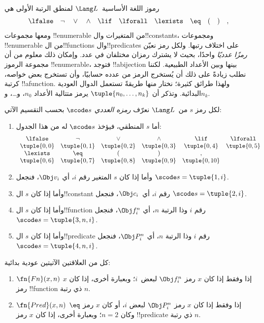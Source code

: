 \documentclass[../../../include/open-logic-section]{subfiles}
\begin{document}

رموز اللغة الأساسية~$\Lang L$ لمنطق الرتبة الأولى هي
\[
\lfalse \quad \lnot \quad \lor \quad \land \quad \lif \quad \lforall
\quad \lexists \quad \eq \quad ( \quad ) \quad ,
\]
ومعها مجموعات !!{enumerable} من المتغيرات
وال!!{constant}s، ومجموعات !!{enumerable}
من ال!!{function}s وال!!{predicate}s على
اختلاف رتبها. ولكل رمز نعيّن \emph{رمزًا عدديًا}
واحدًا، بحيث لا يشترك رمزان مختلفان في عدد.
وإمكان ذلك معلوم من أن مجموعة الرموز
!!{enumerable}، فتوجد !!a{bijection} بينها
وبين الأعداد الطبيعية. لكننا نطلب زيادةً
على ذلك أن يُستخرج الرمز من عدده حسابيًا،
وأن تستخرج بعض خواصه، كرتبة !!a{function}.
ولهذا طرائق كثيرة؛ نختار منها طريقةً
تستعمل الدوال العودية البدائية.
وتذكر أن $\tuple{n_0,\dots,n_k}$ يرمز
متتالية الأعداد $n_0$، و\dots، و$n_k$.

\begin{defn}
لكل رمز $s$ من~$\Lang L$ نعرّف \emph{رمزه العددي}
$\scode s$ بحسب التقسيم الآتي:
\begin{enumerate}
\item أما $s$ المنطقي، فيؤخذ $\scode s$ له من هذا الجدول:
\[
\begin{array}{cccccccccc}
  \lfalse & \lnot & \lor & \land & \lif & \lforall \\
\tuple{0, 0} & \tuple{0, 1} & \tuple{0, 2} & \tuple{0, 3} &
\tuple{0, 4} & \tuple{0, 5} \\
\lexists & \eq & ( & ) & ,\\
\tuple{0, 6} & \tuple{0, 7} &
\tuple{0, 8} & \tuple{0, 9} & \tuple{0, 10}
\end{array}
\]
\item وأما إذا كان $s$ المتغير رقم $i$، أي $\Obj v_i$، فنجعل
$\scode s=\tuple{1,i}$.
\item وأما إذا كان $s$ ال!!{constant} رقم $i$، أي~$\Obj c_i$، فنجعل
  $\scode s=\tuple{2,i}$.
\item وأما إذا كان $s$ ال!!{function} رقم $i$ وذا الرتبة $n$، أي
$\Obj f_i^n$، فنجعل $\scode s=\tuple{3,n,i}$.
\item وأما إذا كان $s$ ال!!{predicate} رقم $i$ وذا الرتبة $n$، أي
$\Obj P_i^n$، فنجعل $\scode s=\tuple{4,n,i}$.
\end{enumerate}
\end{defn}

\begin{prop}
كل من العلاقتين الآتيتين عودية بدائية:
\begin{enumerate}
\item $\fn{Fn}(x,n)$ إذا وفقط إذا كان $x$ رمز $\Obj f^n_i$ لبعض~$i$؛
  وبعبارة أخرى، إذا كان $x$ رمز !!{function} ذي رتبة $n$.
\item $\fn{Pred}(x,n)$ إذا وفقط إذا كان $x$ رمز $\Obj P^n_i$ لبعض
  $i$، أو كان $x$ رمز $\eq$ وكان $n=2$؛ وبعبارة أخرى، إذا كان $x$ رمز
  !!{predicate} ذي رتبة $n$.
\end{enumerate}
\end{prop}
\end{document}
